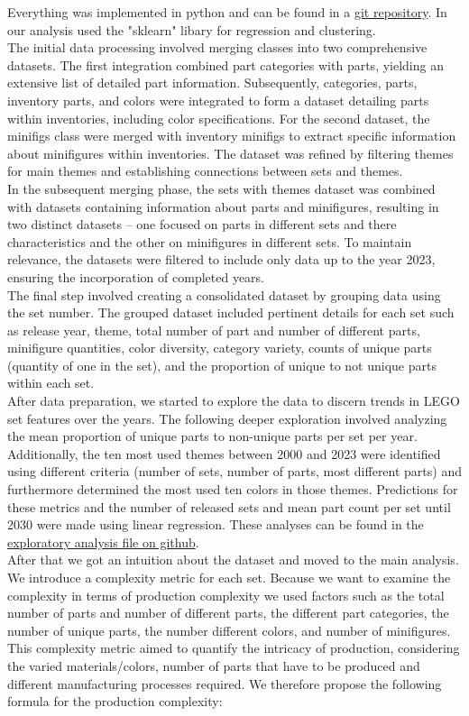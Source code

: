 \documentclass{article}
\theoremstyle{plain}
\theoremstyle{definition}
\theoremstyle{remark}
\begin{document}
Everything was implemented in python and can be found in a \href{https://github.com/eddiebeach99/Data_Literacy/tree/main}{git repository}. In our analysis used the "sklearn" libary for regression and clustering. \\
The initial data processing involved merging classes into two comprehensive datasets. The first integration combined part categories with parts, yielding an extensive list of detailed part information. Subsequently, categories, parts, inventory parts, and colors were integrated to form a dataset detailing parts within inventories, including color specifications. For the second dataset, the minifigs class were merged with inventory minifigs to extract specific information about minifigures within inventories. The dataset was refined by filtering themes for main themes and establishing connections between sets and themes.\\
In the subsequent merging phase, the sets with themes dataset was combined with datasets containing information about parts and minifigures, resulting in two distinct datasets – one focused on parts in different sets and there characteristics and the other on minifigures in different sets. To maintain relevance, the datasets were filtered to include only data up to the year 2023, ensuring the incorporation of completed years.\\
The final step involved creating a consolidated dataset by grouping data using the set number. The grouped dataset included pertinent details for each set such as release year, theme, total number of part and number of different parts, minifigure quantities, color diversity, category variety, counts of unique parts (quantity of one in the set), and the proportion of unique to not unique parts within each set.\\
After data preparation, we started to explore the data to discern trends in LEGO set features over the years. The following deeper exploration involved analyzing the mean proportion of unique parts to non-unique parts per set per year. Additionally, the ten most used themes between 2000 and 2023 were identified using different criteria (number of sets, number of parts, most different parts) and furthermore determined the most used ten colors in those themes. Predictions for these metrics and the number of released sets and mean part count per set until 2030 were made using linear regression. These analyses can be found in the \href{https://github.com/eddiebeach99/Data_Literacy/blob/main/Analysis/exploratory_analysis.ipynb}{exploratory analysis file on github}. \\
After that we got an intuition about the dataset and moved to the main analysis. We introduce a complexity metric for each set. Because we want to examine the complexity in terms of production complexity we used factors such as the total number of parts and number of different parts, the different part categories, the number of unique parts, the number different colors, and number of minifigures. This complexity metric aimed to quantify the intricacy of production, considering the varied materials/colors, number of parts that have to be produced and different manufacturing processes required. We therefore propose the following formula for the production complexity:
\end{document}
